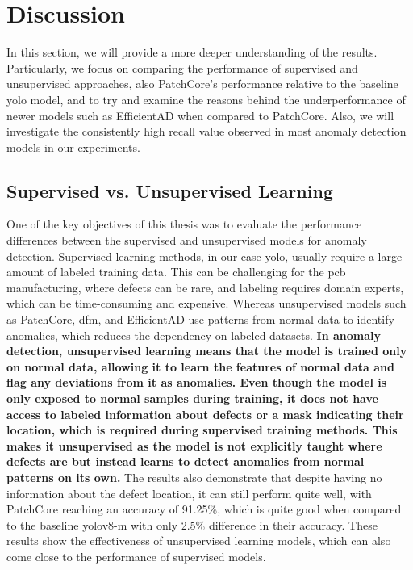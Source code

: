 \chapter{Discussion}

In this section, we will provide a more deeper understanding of the results. Particularly, we focus on comparing the performance of supervised and unsupervised approaches, also PatchCore's performance relative to the baseline \gls{yolo} model, and to try and examine the reasons behind the underperformance of newer models such as EfficientAD when compared to PatchCore. Also, we will investigate the consistently high recall value observed in most anomaly detection models in our experiments.

\section*{Supervised vs. Unsupervised Learning}

One of the key objectives of this thesis was to evaluate the performance differences between the supervised and unsupervised models for anomaly detection. Supervised learning methods, in our case \gls{yolo}, usually require a large amount of labeled training data. This can be challenging for the \gls{pcb} manufacturing, where defects can be rare, and labeling requires domain experts, which can be time-consuming and expensive. Whereas unsupervised models such as PatchCore, \gls{dfm}, and EfficientAD use patterns from normal data to identify anomalies, which reduces the dependency on labeled datasets. \textbf{In anomaly detection, unsupervised learning means that the model is trained only on normal data, allowing it to learn the features of normal data and flag any deviations from it as anomalies. Even though the model is only exposed to normal samples during training, it does not have access to labeled information about defects or a mask indicating their location, which is required during supervised training methods. This makes it unsupervised as the model is not explicitly taught where defects are but instead learns to detect anomalies from normal patterns on its own.} The results also demonstrate that despite having no information about the defect location, it can still perform quite well, with PatchCore reaching an accuracy of 91.25\%, which is quite good when compared to the baseline \gls{yolo}v8-m with only 2.5\% difference in their accuracy. These results show the effectiveness of unsupervised learning models, which can also come close to the performance of supervised models.

